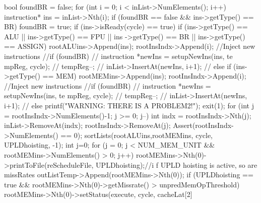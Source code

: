 \begin{DoxyCode}
                                                                                 
                                                                     {
        bool foundBR = false;
        for (int i = 0; i < inList->NumElements(); i++) {
                instruction* ins = inList->Nth(i);
                if (foundBR == false && ins->getType() == BR) {foundBR = true;}
                if (ins->isReady(cycle) == true) {
                        if (ins->getType() == ALU || ins->getType() == FPU || ins
      ->getType() == BR || ins->getType() == ASSIGN) {
                                rootALUins->Append(ins);
                                rootInsIndx->Append(i);
                                //Inject new instructions
                                //if (foundBR) {
                                //      instruction *newIns = setupNewIns(ins, te
      mpReg, cycle);
                                //      tempReg--;
                                //      inList->InsertAt(newIns, i+1);
                                //}
                        } else if (ins->getType() == MEM) {
                                rootMEMins->Append(ins);
                                rootInsIndx->Append(i);
                                //Inject new instructions
                                //if (foundBR) {
                                //      instruction *newIns = setupNewIns(ins, te
      mpReg, cycle);
                                //      tempReg--;
                                //      inList->InsertAt(newIns, i+1);
                                //}
                        } else {
                                printf("WARNING: THERE IS A PROBLEM2!\n");
                                exit(1);
                        }
                }
        }
        for (int j = rootInsIndx->NumElements()-1; j >= 0; j--) {
                int indx = rootInsIndx->Nth(j);
                inList->RemoveAt(indx);
                rootInsIndx->RemoveAt(j);
        }
        Assert(rootInsIndx->NumElements() == 0);
        sortLists(rootALUins,rootMEMins, cycle, UPLDhoisting, -1);
        int j=0;
        for (j = 0; j < NUM_MEM_UNIT && rootMEMins->NumElements() > 0; j++) {
                rootMEMins->Nth(0)->printToFile(reScheduleFile, UPLDhoisting);//i
      f UPLD hoisting is active, so are missRates
                outListTemp->Append(rootMEMins->Nth(0));
                if (UPLDhoisting == true && rootMEMins->Nth(0)->getMissrate() > 
      unpredMemOpThreshold) {
                        rootMEMins->Nth(0)->setStatus(execute, cycle, cacheLat[2]
}}}
\end{DoxyCode}
